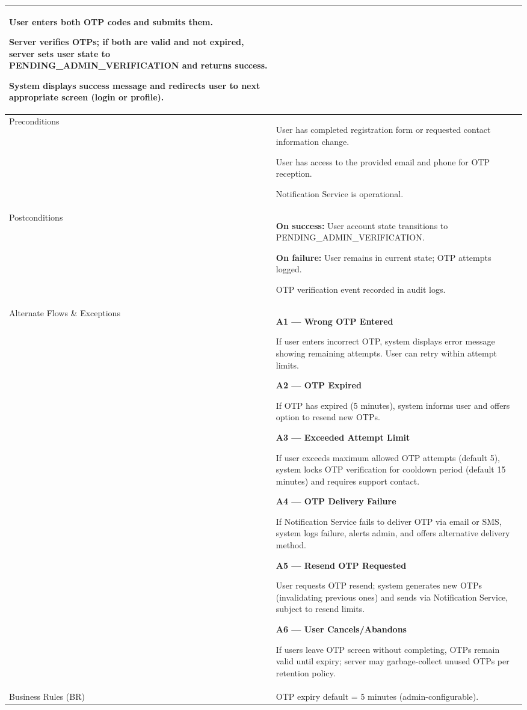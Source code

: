 \begin{longtable}{|p{3.5cm}|p{12cm}|}
User enters both OTP codes and submits them.

Server verifies OTPs; if both are valid and not expired, server sets user state to PENDING\_ADMIN\_VERIFICATION and returns success.

System displays success message and redirects user to next appropriate screen (login or profile). \\
\hline
Preconditions &
User has completed registration form or requested contact information change.

User has access to the provided email and phone for OTP reception.

Notification Service is operational. \\
\hline
Postconditions &
\textbf{On success:} User account state transitions to PENDING\_ADMIN\_VERIFICATION.

\textbf{On failure:} User remains in current state; OTP attempts logged.

OTP verification event recorded in audit logs. \\
\hline
Alternate Flows \& Exceptions &
\textbf{A1 --- Wrong OTP Entered}

If user enters incorrect OTP, system displays error message showing remaining attempts. User can retry within attempt limits.

\textbf{A2 --- OTP Expired}

If OTP has expired (5 minutes), system informs user and offers option to resend new OTPs.

\textbf{A3 --- Exceeded Attempt Limit}

If user exceeds maximum allowed OTP attempts (default 5), system locks OTP verification for cooldown period (default 15 minutes) and requires support contact.

\textbf{A4 --- OTP Delivery Failure}

If Notification Service fails to deliver OTP via email or SMS, system logs failure, alerts admin, and offers alternative delivery method.

\textbf{A5 --- Resend OTP Requested}

User requests OTP resend; system generates new OTPs (invalidating previous ones) and sends via Notification Service, subject to resend limits.

\textbf{A6 --- User Cancels/Abandons}

If users leave OTP screen without completing, OTPs remain valid until expiry; server may garbage-collect unused OTPs per retention policy. \\
\hline
Business Rules (BR) &
OTP expiry default = 5 minutes (admin-configurable).


\end{longtable}
